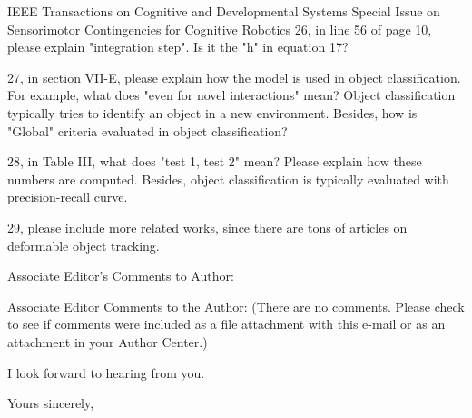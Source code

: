 \documentclass[a4paper,12pt]{letter}
\begin{document}
\begin{letter}{IEEE Transactions on Cognitive and Developmental Systems\newline
Special Issue on Sensorimotor Contingencies for Cognitive Robotics}
26, in line 56 of page 10, please explain "integration step". Is it the "h" in equation 17? 

27, in section VII-E, please explain how the model is used in object classification. For example, what does "even for novel interactions" mean? Object classification typically tries to identify an object in a new environment. Besides, how is "Global" criteria evaluated in object classification? 

28, in Table III, what does "test 1, test 2" mean? Please explain how these numbers are computed. Besides, object classification is typically evaluated with precision-recall curve. 

29, please include more related works, since there are tons of articles on deformable object tracking. 

Associate Editor's Comments to Author: 

Associate Editor 
Comments to the Author: 
(There are no comments. Please check to see if comments were included as a file attachment with this e-mail or as an attachment in your Author Center.)


I look forward to hearing from you.


\signature{Dra. Verónica Esther Arriola Ríos\\
Profesora Asociada C de T.C.\newline
Departamento de Matemáticas, Cub 119.\newline
Facultad de Ciencias, UNAM \newline
v.arriola@ciencias.unam.mx \newline
+(52)55 5622 5426}

\closing{Yours sincerely,}


\end{letter}
\end{document}

